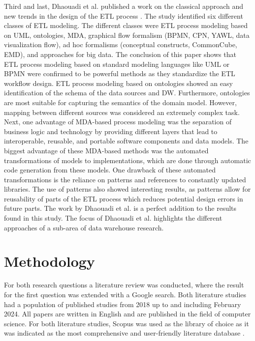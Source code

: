 \documentclass[11pt]{article}
\begin{document}
Third and last, Dhaouadi et al. published a work on the classical approach and new trends in the design of the ETL process \cite{dhaouadi2022data}. The study identified six different classes of ETL modeling. The different classes were ETL process modeling based on UML, ontologies, MDA, graphical flow formalism (BPMN, CPN, YAWL, data visualization flow), ad hoc formalisms (conceptual constructs, CommonCube, EMD), and approaches for big data. The conclusion of this paper shows that ETL process modeling based on standard modeling languages like UML or BPMN were confirmed to be powerful methods as they standardize the ETL workflow design. ETL process modeling based on ontologies showed an easy identification of the schema of the data sources and DW. Furthermore, ontologies are most suitable for capturing the semantics of the domain model. However, mapping between different sources was considered an extremely complex task. Next, one advantage of MDA-based process modeling was the separation of business logic and technology by providing different layers that lead to interoperable, reusable, and portable software components and data models. The biggest advantage of these MDA-based methods was the automated transformations of models to implementations, which are done through automatic code generation from these models. One drawback of these automated transformations is the reliance on patterns and references to constantly updated libraries. The use of patterns also showed interesting results, as patterns allow for reusability of parts of the ETL process which reduces potential design errors in future parts. The work by Dhaouadi et al. is a perfect addition to the results found in this study. The focus of Dhaouadi et al. highlights the different approaches of a sub-area of data warehouse research. \\


\section{Methodology}
\label{methodology}
For both research questions a literature review was conducted, where the result for the first question was extended with a Google search. Both literature studies had a population of published studies from 2018 up to and including February 2024. All papers are written in English and are published in the field of computer science. For both literature studies, Scopus was used as the library of choice as it was indicated as the most comprehensive and user-friendly literature database \cite{harzing2016google, mongeon2016journal}.\\
\end{document}
